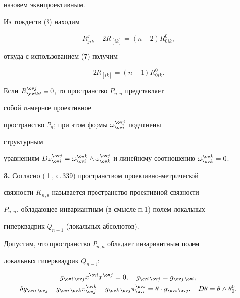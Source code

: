 назовем эквипроективным. 


 


Из тождеств (8) находим 


$$ 


R^j_{jik}+2R_{[ik]}=(n-2)R^0_{0ik}, 


$$ 


откуда с использованием (7) получим 


\begin{equation} 


2R_{[ik]}=(n-1)R^0_{0ik}. 


\end{equation} 


 


Если $R^{\ov j}_{\ov i kt}\equiv0$, то пространство $P_{n,n}$ представляет 


собой $n$-мерное проективное 


пространство $P_n$; при этом формы $\omega^{\ov j}_{\ov i}$ подчинены 


структурным 


уравнениям $D\omega^{\ov j}_{\ov i}=\omega^{\ov k}_{\ov i}\wedge 


\omega^{\ov j}_{\ov k}$ и линейному соотношению $\omega^{\ov k}_{\ov 


k}=0$. 


\medskip 


 


{\bf 3.} Согласно ([1], с.\,339) пространством проективно-метрической 


связности $K_{n,n}$ называется пространство проективной связности 


$P_{n,n}$, обладающее инвариантным (в смысле п.\,1) полем локальных 


гиперквадрик $Q_{n-1}$ (локальных абсолютов). 


 


Допустим, что пространство $P_{n,n}$ обладает инвариантным полем 


локальных гиперквадрик $Q_{n-1}$: 


\begin{gather} 


g_{\ov i\,\ov j}x^{\ov i}x^{\ov j}=0,\quad 


g_{\ov i\,\ov j}=g_{\ov j\,\ov i},\\ 


\delta g_{\ov i\,\ov j}-g_{\ov i\,\ov k} 


\pi^{\ov k}_{\ov j}-g_{\ov k\,\ov j} 


\pi^{\ov k}_{\ov i}=\theta\cdot g_{\ov i\,\ov j},\quad 


D\theta=\theta\wedge\theta^0_0. 


\end{gather} 


